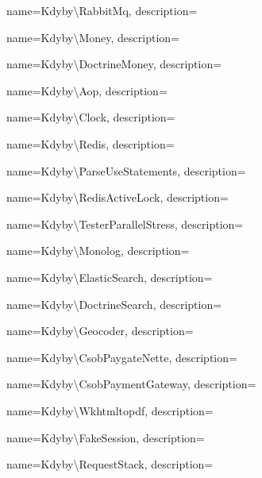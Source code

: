  {
  name={Kdy\-by\textbackslash{}Ra\-bbit\-Mq},
  description={} }

 {
  name={Kdy\-by\textbackslash{}Mo\-ney},
  description={} }

 {
  name={Kdy\-by\textbackslash{}Doc\-tri\-ne\-Mo\-ney},
  description={} }

 {
  name={Kdy\-by\textbackslash{}Aop},
  description={} }

 {
  name={Kdy\-by\textbackslash{}Clo\-ck},
  description={} }

 {
  name={Kdy\-by\textbackslash{}Re\-di\-s},
  description={} }

 {
  name={Kdy\-by\textbackslash{}Par\-se\-Use\-Sta\-te\-men\-ts},
  description={} }

 {
  name={Kdy\-by\textbackslash{}Re\-dis\-Acti\-ve\-Lock},
  description={} }

 {
  name={Kdy\-by\textbackslash{}Tes\-ter\-Pa\-ra\-llel\-St\-ress},
  description={} }

 {
  name={Kdy\-by\textbackslash{}Mo\-no\-log},
  description={} }

 {
  name={Kdy\-by\textbackslash{}Elastic\-Sear\-ch},
  description={} }

 {
  name={Kdy\-by\textbackslash{}Doc\-tri\-ne\-Sear\-ch},
  description={} }

 {
  name={Kdy\-by\textbackslash{}Geo\-co\-der},
  description={} }

 {
  name={Kdy\-by\textbackslash{}Csob\-Pay\-gate\-Nette},
  description={} }

 {
  name={Kdy\-by\textbackslash{}Csob\-Pay\-me\-nt\-Ga\-te\-way},
  description={} }

 {
  name={Kdy\-by\textbackslash{}Wk\-html\-to\-pdf},
  description={} }

 {
  name={Kdy\-by\textbackslash{}Fa\-ke\-Ses\-si\-on},
  description={} }

 {
  name={Kdy\-by\textbackslash{}Re\-que\-st\-Sta\-ck},
  description={} }

